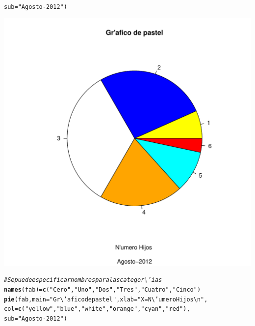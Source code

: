 \documentclass[12pt,letterpaper]{article}\usepackage[]{graphicx}\usepackage[]{color}
\makeatletter
\def\maxwidth{ %
  \ifdim\Gin@nat@width>\linewidth
    \linewidth
  \else
    \Gin@nat@width
  \fi
}
\newcommand{\hlstr}[1]{\textcolor[rgb]{0.192,0.494,0.8}{#1}}%
\newcommand{\hlcom}[1]{\textcolor[rgb]{0.678,0.584,0.686}{\textit{#1}}}%
\newcommand{\hlstd}[1]{\textcolor[rgb]{0.345,0.345,0.345}{#1}}%
\newcommand{\hlkwb}[1]{\textcolor[rgb]{0.69,0.353,0.396}{#1}}%
\newcommand{\hlkwc}[1]{\textcolor[rgb]{0.333,0.667,0.333}{#1}}%
\newcommand{\hlkwd}[1]{\textcolor[rgb]{0.737,0.353,0.396}{\textbf{#1}}}%
\newenvironment{kframe}{%
 \def\at@end@of@kframe{}%
 \ifinner\ifhmode%
  \def\at@end@of@kframe{\end{minipage}}%
  \begin{minipage}{\columnwidth}%
 \fi\fi%
 \def\FrameCommand##1{\hskip\@totalleftmargin \hskip-\fboxsep
 \colorbox{shadecolor}{##1}\hskip-\fboxsep
     \hskip-\linewidth \hskip-\@totalleftmargin \hskip\columnwidth}%
 \MakeFramed {\advance\hsize-\width
   \@totalleftmargin\z@ \linewidth\hsize
   \@setminipage}}%
 {\par\unskip\endMakeFramed%
 \at@end@of@kframe}
\newenvironment{knitrout}{}{} %
\makeatother
\begin{document}
\begin {itemize}
\begin{knitrout}
\begin{kframe}
\begin{alltt}
    \hlkwc{sub}\hlstd{=}\hlstr{"Agosto-2012"}\hlstd{)}
\end{alltt}
\end{kframe}
\includegraphics[width=\maxwidth]{figure/unnamed-chunk-9-2} 
\begin{kframe}\begin{alltt}
\hlcom{# Se puede especificar nombres para las categor\textbackslash{}'ias}
\hlkwd{names}\hlstd{(fab)} \hlkwb{=} \hlkwd{c}\hlstd{(}\hlstr{"Cero"}\hlstd{,} \hlstr{"Uno"}\hlstd{,} \hlstr{"Dos"}\hlstd{,} \hlstr{"Tres"}\hlstd{,} \hlstr{"Cuatro"}\hlstd{,} \hlstr{"Cinco"}\hlstd{)}
\hlkwd{pie}\hlstd{(fab,} \hlkwc{main}\hlstd{=}\hlstr{"Gr\textbackslash{}'afico de pastel"}\hlstd{,} \hlkwc{xlab}\hlstd{=}\hlstr{"X = N\textbackslash{}'umero Hijos\textbackslash{}n"}\hlstd{,}
    \hlkwc{col}\hlstd{=}\hlkwd{c}\hlstd{(}\hlstr{"yellow"}\hlstd{,} \hlstr{"blue"}\hlstd{,}\hlstr{"white"}\hlstd{,} \hlstr{"orange"}\hlstd{,} \hlstr{"cyan"}\hlstd{,} \hlstr{"red"}\hlstd{),}
    \hlkwc{sub}\hlstd{=}\hlstr{"Agosto-2012"}\hlstd{)}
\end{alltt}
\end{kframe}

\end{knitrout}
\end{itemize}
\end{document}
